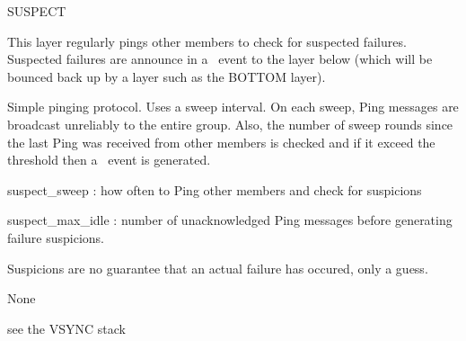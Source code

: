 \begin{Layer}{SUSPECT}

This layer regularly pings other members to check for suspected
failures.  Suspected failures are announce in a \DnSuspect\ event to
the layer below (which will be bounced back up by a layer such as the
BOTTOM layer).

\begin{Protocol}
Simple pinging protocol.  Uses a sweep interval.  On each sweep, Ping
messages are broadcast unreliably to the entire group.  Also, the
number of sweep rounds since the last Ping was received from other
members is checked and if it exceed the  threshold
then a \DnSuspect\ event is generated.  
\end{Protocol}

\begin{Parameters}
\item 
suspect\_sweep : how often to Ping other members and check for suspicions
\item
suspect\_max\_idle : number of unacknowledged Ping messages before generating
failure suspicions.
\end{Parameters}

\begin{Properties}
\item
Suspicions are no guarantee that an actual failure has occured, only a guess.
\end{Properties}

\begin{Notes}
\item None
\end{Notes}

\begin{Sources}
\end{Sources}

\begin{GenEvent}
\genevent{\DnSuspect}
\genevent{\DnCast}
\genevent{\DnTimer}
\end{GenEvent}

\begin{Testing}
\item see the VSYNC stack
\end{Testing}
\end{Layer}
